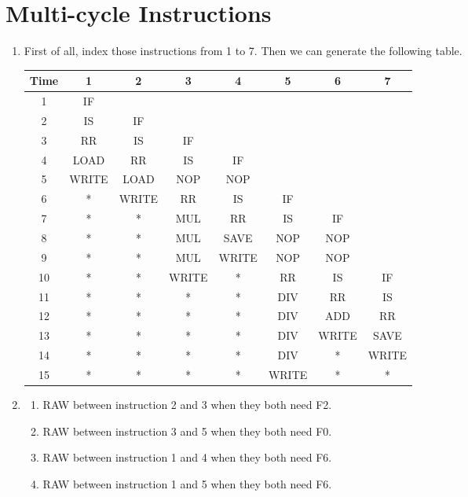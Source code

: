 \documentclass{article}
\begin{document}
    \section{Multi-cycle Instructions}
    \begin{enumerate}
	\item First of all, index those instructions from 1 to 7. Then we can generate the following table. \newline
	\begin{tabular}{|c|c|c|c|c|c|c|c|}
	    \hline
	    Time & 1 & 2 & 3 & 4 & 5 & 6 & 7 \\
	    \hline
	    1 & IF & & & & & &\\
	    \hline
	    2 & IS & IF & & & & & \\
	    \hline
	    3 & RR & IS & IF & & & &\\
	    \hline
	    4 & LOAD & RR & IS & IF & & &\\
	    \hline
	    5 & WRITE & LOAD & NOP & NOP& & &\\
	    \hline
	    6 & * & WRITE & RR & IS & IF & & \\
	    \hline
	    7 & * & * & MUL & RR & IS & IF &\\
	    \hline
	    8 & * & * & MUL & SAVE & NOP& NOP& \\
	    \hline
	    9 & * & * & MUL & WRITE & NOP& NOP& \\
	    \hline
	    10 & * & *& WRITE & * & RR & IS & IF \\
	    \hline
	    11 & * & * & * & * & DIV & RR & IS \\
	    \hline
	    12 & * & * & * & * & DIV & ADD & RR \\
	    \hline
	    13 & * & * & * & * & DIV & WRITE & SAVE \\
	    \hline
	    14 & * & * & * & * & DIV & * & WRITE \\
	    \hline
	    15 & * & * & * & * & WRITE & * & * \\
	    \hline
	\end{tabular}
	\item \begin{enumerate}
	    \item RAW between instruction 2 and 3 when they both need F2.
	    \item RAW between instruction 3 and 5 when they both need F0.
	    \item RAW between instruction 1 and 4 when they both need F6.
	    \item RAW between instruction 1 and 5 when they both  need F6.

\end{enumerate}
\end{enumerate}
\end{document}
